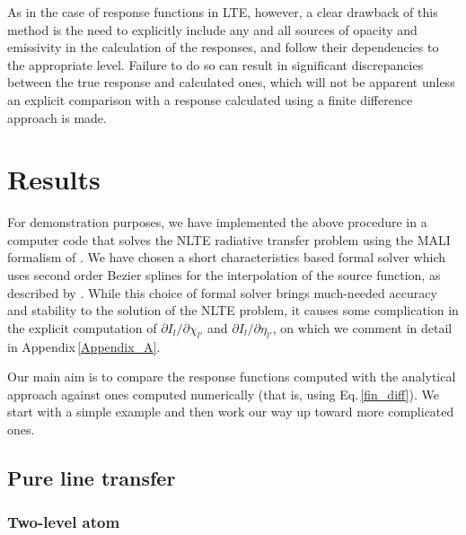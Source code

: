 \documentclass[referee]{aa}
\begin{document}
As in the case of response functions in LTE, however, a clear drawback of this method is the need to explicitly include any and all sources of opacity and emissivity in the calculation of the responses, and follow their dependencies to the appropriate level. Failure to do so can result in significant discrepancies between the true response and calculated ones, which will not be apparent unless an explicit comparison with a response calculated using a finite difference approach is made.

\section{Results}

For demonstration purposes, we have implemented the above procedure in a computer code that solves the NLTE radiative transfer problem using the MALI formalism of \citet{RH1}. We have chosen a short characteristics based formal solver which uses second order Bezier splines for the interpolation of the source function, as described by \citet{JaimeBezier}. While this choice of formal solver brings much-needed accuracy and stability to the solution of the NLTE problem, it causes some complication in the explicit computation of $\partial I_l/\partial \chi_{l'}$ and $\partial I_l/\partial \eta_{l'}$, on which we comment in detail in Appendix\,\ref{Appendix_A}.

Our main aim is to compare the response functions computed with the analytical approach against ones computed numerically (that is, using Eq.\,\ref{fin_diff}). We start with a simple example and then work our way up toward more complicated ones. 

\subsection{Pure line transfer}

\subsubsection{Two-level atom}
\end{document}

